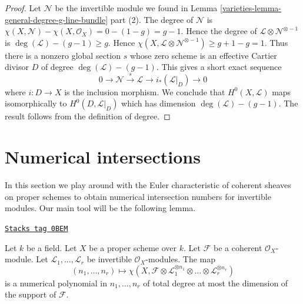 \begin{proof}

Let $\mathcal{N}$ be the invertible module we found in
Lemma \ref{varieties-lemma-general-degree-g-line-bundle} part (2).
The degree of $\mathcal{N}$ is
$\chi(X, \mathcal{N}) - \chi(X, \mathcal{O}_X) = 0 - (1 - g) = g - 1$.
Hence the degree of $\mathcal{L} \otimes \mathcal{N}^{\otimes - 1}$
is $\deg(\mathcal{L}) - (g - 1) \geq g$.
Hence
$\chi(X, \mathcal{L} \otimes \mathcal{N}^{\otimes -1}) \geq g + 1 - g = 1$.
Thus there is a nonzero global section $s$ whose zero scheme is an
effective Cartier divisor $D$ of degree $\deg(\mathcal{L}) - (g - 1)$.
This gives a short exact sequence
$$
0 \to \mathcal{N} \xrightarrow{s} \mathcal{L} \to i_*(\mathcal{L}|_D) \to 0
$$
where $i : D \to X$ is the inclusion morphism. We conclude that
$H^0(X, \mathcal{L})$ maps isomorphically to $H^0(D, \mathcal{L}|_D)$
which has dimension $\deg(\mathcal{L}) - (g - 1)$. The result follows
from the definition of degree.
\end{proof}

\section{Numerical intersections}
\label{varieties-section-num}
In this section we play around with the Euler characteristic of
coherent sheaves on proper schemes to obtain numerical intersection
numbers for invertible modules. Our main tool will be the following
lemma.

\begin{lemma}
\label{varieties-lemma-numerical-polynomial-from-euler}
\href{https://stacks.math.columbia.edu/tag/0BEM}{\texttt{Stacks tag 0BEM}}

Let $k$ be a field. Let $X$ be a proper scheme over $k$. Let $\mathcal{F}$
be a coherent $\mathcal{O}_X$-module. Let
$\mathcal{L}_1, \ldots, \mathcal{L}_r$ be invertible $\mathcal{O}_X$-modules.
The map
$$
(n_1, \ldots, n_r) \longmapsto
\chi(X, \mathcal{F} \otimes
\mathcal{L}_1^{\otimes n_1} \otimes \ldots \otimes
\mathcal{L}_r^{\otimes n_r})
$$
is a numerical polynomial in $n_1, \ldots, n_r$ of total degree at
most the dimension of the support of $\mathcal{F}$.
\end{lemma}

